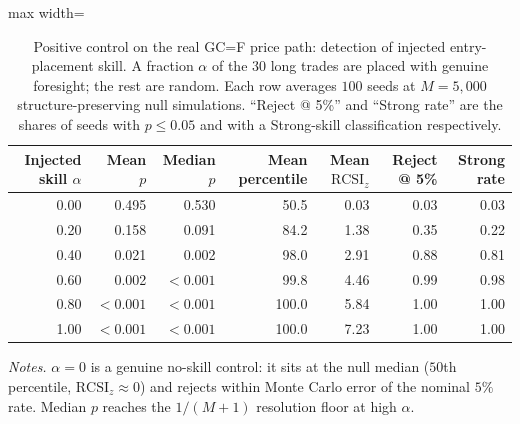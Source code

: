 \documentclass[preprint,12pt]{elsarticle}
\theoremstyle{definition}
\begin{document}
\begin{table}[H]
\centering
\caption{Positive control on the real GC=F price path: detection of injected entry-placement skill. A fraction $\alpha$ of the $30$ long trades are placed with genuine foresight; the rest are random. Each row averages $100$ seeds at $M=5{,}000$ structure-preserving null simulations. ``Reject @ 5\%'' and ``Strong rate'' are the shares of seeds with $p\le0.05$ and with a Strong-skill classification respectively.}
\label{tab:positive_control}
{\small
\renewcommand{\arraystretch}{1.12}
\begin{adjustbox}{max width=\textwidth}
\begin{tabular}{@{}rrrrrrr@{}}
\toprule
Injected skill $\alpha$ & Mean $p$ & Median $p$ & Mean percentile & Mean $\mathrm{RCSI}_z$ & Reject @ 5\% & Strong rate \\
\midrule
0.00 & 0.495 & 0.530 & \phantom{0}50.5 & 0.03 & 0.03 & 0.03 \\
0.20 & 0.158 & 0.091 & \phantom{0}84.2 & 1.38 & 0.35 & 0.22 \\
0.40 & 0.021 & 0.002 & \phantom{0}98.0 & 2.91 & 0.88 & 0.81 \\
0.60 & 0.002 & $<0.001$ & \phantom{0}99.8 & 4.46 & 0.99 & 0.98 \\
0.80 & $<0.001$ & $<0.001$ & 100.0 & 5.84 & 1.00 & 1.00 \\
1.00 & $<0.001$ & $<0.001$ & 100.0 & 7.23 & 1.00 & 1.00 \\
\bottomrule
\end{tabular}
\end{adjustbox}
}
\par\vspace{0.5em}
\begin{minipage}{0.95\textwidth}
\centering
\footnotesize\emph{Notes.} $\alpha=0$ is a genuine no-skill control: it sits at the null median ($50$th percentile, $\mathrm{RCSI}_z\approx0$) and rejects within Monte Carlo error of the nominal $5\%$ rate. Median $p$ reaches the $1/(M+1)$ resolution floor at high $\alpha$.
\end{minipage}
\end{table}
\end{document}
